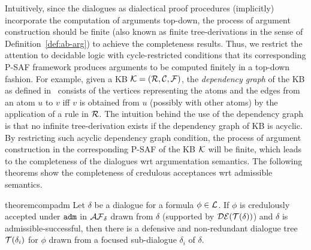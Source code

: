 Intuitively, since the dialogues as dialectical proof procedures (implicitly) incorporate the computation of arguments top-down, the process of argument construction should be finite (also known as finite tree-derivations in the sense of Definition~\ref{def:ab-arg}) to achieve the completeness results. Thus, we restrict the attention to decidable logic with cycle-restricted conditions that its corresponding P-SAF framework produces arguments to be computed finitely in a top-down fashion. For example, given a \datalogPM KB $\mathcal{K} = (\mathcal{R}, \mathcal{C}, \mathcal{F})$, the \emph{dependency graph} of the KB  as defined in~\cite{HechamBC17}  consists of the vertices representing the atoms and the edges from an atom $u$ to $v$ iff $v$ is obtained from $u$ (possibly with other atoms) by the application of a rule in $\mathcal{R}$. The intuition behind the use of the dependency graph is that no infinite tree-derivation exists if the dependency graph of KB is acyclic. By restricting such acyclic dependency graph condition, the process of argument construction in the corresponding  P-SAF of the KB $\mathcal{K}$ will be finite, which leads to the completeness of the dialogues wrt argumentation semantics. The following theorems show the completeness of credulous acceptances wrt admissible semantics.



 




\begin{restatable} {theorem}{compadm}
\label{thm:com-adm}
Let $\delta$ be a dialogue for a formula $\phi \in \mathcal{L}$. If $\phi$ is credulously accepted under $\texttt{\textup{adm}}$ in $\mathcal{AF}_ \delta$ drawn from $\delta$ (supported by $\mathcal{DE}(\mathcal{T}(\delta))$)
and $\delta$ is admissible-successful, then there is a defensive and non-redundant dialogue tree $\mathcal{T}(\delta_i)$ for $\phi$ drawn from a focused sub-dialogue $\delta_i$ of $\delta$.
\end{restatable}


